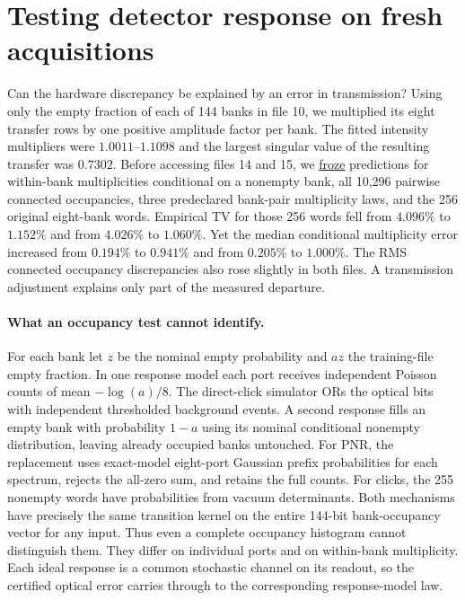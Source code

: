 \documentclass[11pt]{article}
\begin{document}
\section{Testing detector response on fresh acquisitions}\label{sec:responses}
Can the hardware discrepancy be explained by an error in transmission? Using only the empty fraction of each of 144 banks in file 10, we multiplied its eight transfer rows by one positive amplitude factor per bank. The fitted intensity multipliers were $1.0011$--$1.1098$ and the largest singular value of the resulting transfer was $0.7302$. Before accessing files 14 and 15, we \href{https://github.com/qiyuanhuakai/deziroGBS/tree/321db37fc23a43e9d1f7f8a037e03fbc68b362ae/results/iteration120_contractions}{froze} predictions for within-bank multiplicities conditional on a nonempty bank, all 10,296 pairwise connected occupancies, three predeclared bank-pair multiplicity laws, and the 256 original eight-bank words. Empirical TV for those 256 words fell from $4.096\%$ to $1.152\%$ and from $4.026\%$ to $1.060\%$. Yet the median conditional multiplicity error increased from $0.194\%$ to $0.941\%$ and from $0.205\%$ to $1.000\%$. The RMS connected occupancy discrepancies also rose slightly in both files. A transmission adjustment explains only part of the measured departure.

\paragraph{What an occupancy test cannot identify.}
For each bank let $z$ be the nominal empty probability and $az$ the training-file empty fraction. In one response model each port receives independent Poisson counts of mean $-\log(a)/8$. The direct-click simulator ORs the optical bits with independent thresholded background events. A second response fills an empty bank with probability $1-a$ using its nominal conditional nonempty distribution, leaving already occupied banks untouched. For PNR, the replacement uses exact-model eight-port Gaussian prefix probabilities for each spectrum, rejects the all-zero sum, and retains the full counts. For clicks, the 255 nonempty words have probabilities from vacuum determinants. Both mechanisms have precisely the same transition kernel on the entire 144-bit bank-occupancy vector for any input. Thus even a complete occupancy histogram cannot distinguish them. They differ on individual ports and on within-bank multiplicity. Each ideal response is a common stochastic channel on its readout, so the certified optical error carries through to the corresponding response-model law.
\end{document}
